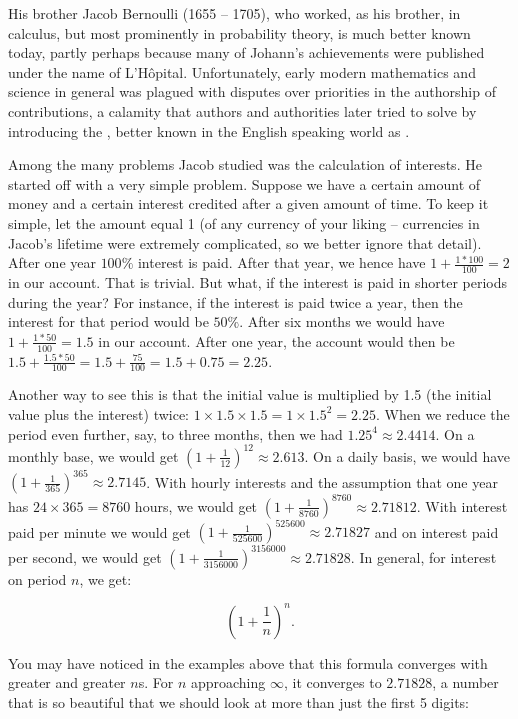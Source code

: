 \documentclass[tikz]{scrreprt}
\begin{document}
His brother Jacob Bernoulli (1655 -- 1705),
who worked, as his brother, in calculus, but
most prominently in probability theory, 
is much better known today, partly perhaps
because many of Johann's achievements 
were published under the name of L'Hôpital.
Unfortunately, early modern mathematics 
and science in general was
plagued with disputes over priorities in the
authorship of contributions, a calamity
that authors and authorities later tried to
solve by introducing the ,
better known in the English speaking world as
.

Among the many problems Jacob studied was
the calculation of interests. He started off
with a very simple problem. Suppose we have
a certain amount of money and a certain interest
credited after a given amount of time. To keep it
simple, let the amount equal 1 (of any currency
of your liking -- currencies in Jacob's lifetime
were extremely complicated, so we better ignore
that detail). After one year $100\%$ interest is paid.
After that year, we hence have $1+\frac{1*100}{100} = 2$ 
in our account. That is trivial.
But what, if the interest is paid in shorter periods
during the year?
For instance, if the interest is paid twice a year,
then the interest for that period would be $50\%$.
After six months we would have $1+\frac{1*50}{100} = 1.5$
in our account. After one year, the account would then be
$1.5 + \frac{1.5*50}{100} = 1.5 + \frac{75}{100} = 1.5 + 0.75 = 2.25$.

Another way to see this is that the initial value 
is multiplied by 1.5 (the initial value plus the interest) twice:
$1 \times 1.5 \times 1.5 = 1 \times 1.5^2 = 2.25$.
When we reduce the period even further, say, to three months,
then we had $1.25^4 \approx 2.4414$. On a monthly base,
we would get $(1+\frac{1}{12})^{12} \approx 2.613$.
On a daily basis, we would have 
$(1+\frac{1}{365})^{365} \approx 2.7145$.
With hourly interests and the assumption
that one year has $24 \times 365 = 8760$ hours, 
we would get $(1+\frac{1}{8760})^{8760} \approx 2.71812$.
With interest paid per minute we would get
$(1+\frac{1}{525600})^{525600} \approx 2.71827$ and
on interest paid per second, we would get
$(1+\frac{1}{3156000})^{3156000} \approx 2.71828$.
In general, for interest on period $n$, we get:

\[
\left(1+\frac{1}{n}\right)^n.
\] 

You may have noticed in the examples above
that this formula converges with greater and greater $n$s.
For $n$ approaching $\infty$, it converges
to $2.71828$, a number that is so beautiful that we should
look at more than just the first 5 digits:
\end{document}
